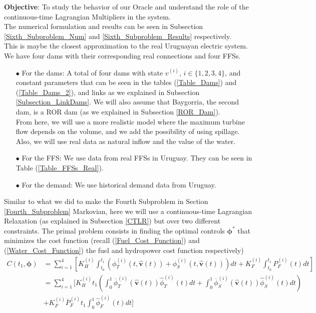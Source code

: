 \textbf{Objective}: To study the behavior of our Oracle and understand the role of the continuous-time Lagrangian Multipliers in the system.\\

The numerical formulation and results can be seen in Subsection \ref{Sixth_Subproblem_Num} and \ref{Sixth_Subproblem_Results} respectively.\\

This is maybe the closest approximation to the real Uruguayan electric system. We have four dams with their corresponding real connections and four FFSs.

\begin{enumerate}

\item[$\bullet$] For the dams: A total of four dams with state $v^{(i)}$, $i\in\{1,2,3,4\}$, and constant parameters  that can be seen in the tables (\ref{Table_Dams}) and (\ref{Table_Dams_2}), and links as we explained in Subsection \ref{Subsection_LinkDams}. We will also assume that Baygorria, the second dam, is a ROR dam (as we explained in Subsection \ref{ROR_Dam}).\\
From here, we will use a more realistic model where the maximum turbine flow depends on the volume, and we add the possibility of using spillage. Also, we will use real data as natural inflow and the value of the water.

\item[$\bullet$] For the FFS: We use data from real FFSs in Uruguay. They can be seen in Table (\ref{Table_FFSs_Real}).

\item[$\bullet$] For the demand: We use historical demand data from Uruguay.

\end{enumerate}
Similar to what we did to make the Fourth Subproblem in Section \ref{Fourth_Subproblem} Markovian, here we will use a continuous-time Lagrangian Relaxation (as explained in Subsection \ref{CTLR}) but over two different constraints. The primal problem consists in finding the optimal controls $\bm{\phi}^*$ that minimizes the cost function (recall (\ref{Fuel_Cost_Function}) and (\ref{Water_Cost_Function}) the fuel and hydropower cost function respectively)
\begin{equation}
\begin{split}
C(t_1,\bm{\phi})&=\sum_{i=1}^4\left[K_H^{(i)}\int_{t_0}^{t_1}\left(\phi_T^{(i)}(t,\hat{\bm{v}}(t))+\phi_S^{(i)}(t,\hat{\bm{v}}(t))\right)dt+K_F^{(i)}\int_{t_0}^{t_1}P_F^{(i)}(t)dt\right]\\
&=\sum_{i=1}^4\Bigg[K_H^{(i)}t_1\left(\int_{0}^{1}\overline{\phi}_T^{(i)}(\hat{\bm{v}}(t))\hat{\phi}_T^{(i)}(t)dt+\int_{0}^{1}\overline{\phi}_S^{(i)}(\hat{\bm{v}}(t))\hat{\phi}_S^{(i)}(t)dt\right)\\
&+K_F^{(i)}\overline{P}_F^{(i)}t_1\int_{0}^{1}\hat{\phi}_F^{(i)}(t)dt\Bigg]
\end{split}
\end{equation}
